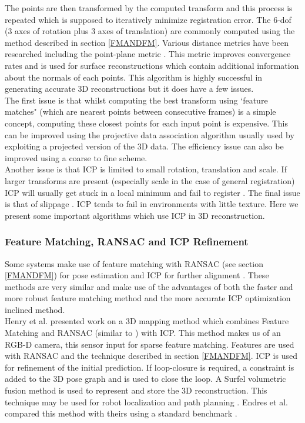 The points are then transformed by the computed transform and this process is repeated which is supposed to iteratively minimize registration error. The 6-dof (3 axes of rotation plus 3 axes of translation) are commonly computed using the method described in section \ref{FMANDFM}. Various distance metrics have been researched including the point-plane metric \cite{Chen92Object}. This metric improves convergence rates and is used for surface reconstructions which contain additional information about the normals of each points. This algorithm is highly successful in generating accurate 3D reconstructions but it does have a few issues. \\

The first issue is that whilst computing the best transform using `feature matches" (which are nearest points between consecutive frames) is a simple concept, computing these closest points for each input point is expensive. This can be improved using the projective data association algorithm \cite{Blais95Registering} usually used by exploiting a projected version of the 3D data. The efficiency issue can also be improved using a coarse to fine scheme. \\

Another issue is that ICP is limited to small rotation, translation and scale. If larger transforms are present (especially scale in the case of general registration) ICP will usually get stuck in a local minimum and fail to register \cite{Mitra04Registration}. The final issue is that of slippage \cite{Whelan13Robust}. ICP tends to fail in environments with little texture. Here we present some important algorithms which use ICP in 3D reconstruction.

\subsubsection{Feature Matching, RANSAC and ICP Refinement}

Some systems make use of feature matching with RANSAC (see section \ref{FMANDFM}) for pose estimation and ICP for further alignment \cite{Engelhard11Real, Henry10Rgb}. These methods are very similar and make use of the advantages of both the faster and more robust feature matching method and the more accurate ICP optimization inclined method. \\

Henry et al. \cite{Henry10Rgb} presented work on a 3D mapping method which combines Feature Matching and RANSAC (similar to \cite{Endres12Evaluation}) with ICP. This method makes us of an RGB-D camera, this sensor input for sparse feature matching. Features are used with RANSAC and the technique described in section \ref{FMANDFM}. ICP is used for refinement of the initial prediction. If loop-closure is required, a constraint is added to the 3D pose graph \cite{Kummerle11G} and is used to close the loop. A Surfel \cite{Pfister00Surfels} volumetric fusion method is used to represent and store the 3D reconstruction. This technique may be used for robot localization and path planning \cite{Hornung10Humanoid}. Endres et al. \cite{Endres12Evaluation} compared this method with theirs using a standard benchmark \cite{Sturm12Benchmark}.  \\

